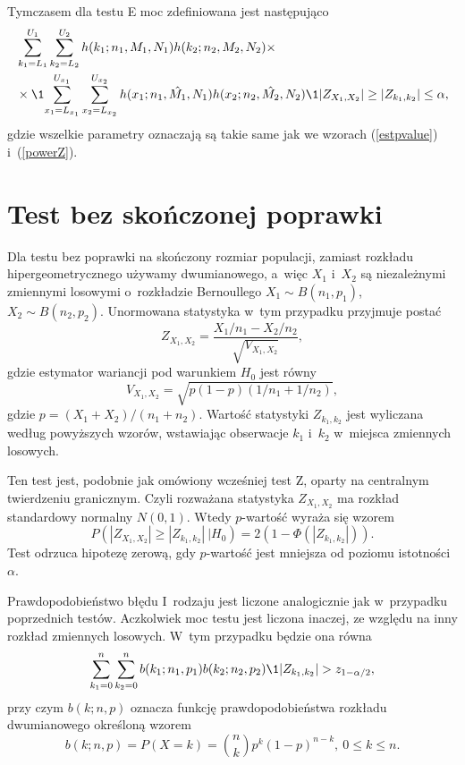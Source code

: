 Tymczasem dla testu E moc zdefiniowana jest następująco
\begin{equation}
\begin{split}
&\sum_{k_1=L_1}^{U_1}\sum_{k_2=L_2}^{U_2} h(k_1;n_1,M_1,N_1)h(k_2;n_2,M_2,N_2) \times \\
& \times \1{\sum_{x_1=L_{x_1}}^{U_{x_1}}\sum_{x_2=L_{x_2}}^{U_{x_2}} h(x_1;n_1,\hat{M_1},N_1)h(x_2;n_2,\hat{M_2},N_2) \1{|Z_{X_1,X_2}|\geq|Z_{k_1,k_2}|}\leq\alpha },
\end{split}
\end{equation}
gdzie wszelkie parametry oznaczają są takie same jak we wzorach (\ref{estpvalue}) i~(\ref{powerZ}).

\section{Test bez skończonej poprawki}
Dla testu bez poprawki na skończony rozmiar populacji, zamiast rozkładu hipergeometrycznego używamy dwumianowego, a~więc $X_1$ i~$X_2$ są niezależnymi zmiennymi losowymi o~rozkładzie Bernoullego $X_1\sim B(n_1,p_1)$, $X_2\sim B(n_2,p_2)$. Unormowana statystyka w~tym przypadku przyjmuje postać
\begin{equation}
Z_{X_1,X_2} = \frac{X_1/n_1-X_2/n_2}{\sqrt{V_{X_1,X_2}}},
\end{equation}
gdzie estymator wariancji pod warunkiem $H_0$ jest równy
\begin{equation}
V_{X_1,X_2} = \sqrt{p(1-p)(1/n_1+1/n_2)},
\end{equation}
gdzie $p=(X_1+X_2)/(n_1+n_2)$.
Wartość statystyki $Z_{k_1,k_2}$ jest wyliczana według powyższych wzorów, wstawiając obserwacje $k_1$ i~$k_2$ w~miejsca zmiennych losowych.

Ten test jest, podobnie jak omówiony wcześniej test Z, oparty na centralnym twierdzeniu granicznym. Czyli rozważana statystyka $Z_{X_1,X_2}$ ma rozkład standardowy normalny $N(0,1)$. Wtedy $p$-wartość wyraża się wzorem
\begin{equation}
P(|Z_{X_1,X_2}|\geq|Z_{k_1,k_2}|\ |H_0) = 2(1-\Phi(|Z_{k_1,k_2}|)).
\end{equation}
Test odrzuca hipotezę zerową, gdy $p$-wartość jest mniejsza od poziomu istotności $\alpha$.

Prawdopodobieństwo błędu I~rodzaju jest liczone analogicznie jak w~przypadku poprzednich testów. Aczkolwiek moc testu jest liczona inaczej, ze względu na inny rozkład zmiennych losowych. W~tym przypadku będzie ona równa
\begin{equation}
\sum_{k_1=0}^{n}\sum_{k_2=0}^{n} b(k_1;n_1,p_1)b(k_2;n_2,p_2)\1{|Z_{k_1,k_2}|>z_{1-\alpha/2}},
\end{equation}
przy czym $b(k;n,p)$ oznacza funkcję prawdopodobieństwa rozkładu dwumianowego określoną wzorem
\begin{equation}
b(k;n,p) = P(X=k) = \binom{n}{k} p^k (1-p)^{n-k},\ 0\leq k\leq n.
\end{equation}
